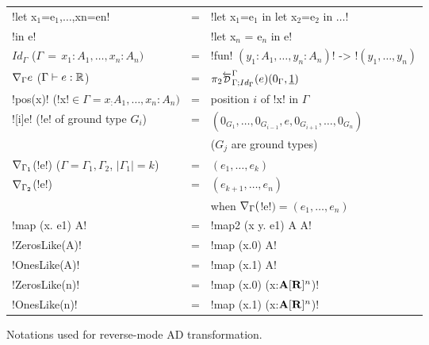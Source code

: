 \begin{figure}
\begin{tabular}{|l c l|}
    \hline
    !let x$_{1}$=e$_{1}$,$\ldots$,xn=en!  & \multirow{2}{*}{=} & !let x$_{1}$=e$_{1}$ in let x$_{2}$=e$_{2}$ in $\ldots$! \\
    !in e! && !let x$_n$ = e$_n$ in e!\\ \hline
    $Id_\Gamma$ \quad\quad\quad ($\Gamma \, = \, x_1:A_1,\ldots,x_n:A_n)$ & = & !fun! $(y_1:A_1,\ldots,y_n:A_n)$! -> !$(y_1,\ldots,y_n)$ \\ \hline
    $\nabla_\Gamma e$ \quad\quad\hspace{0.6em}($\Gamma\vdash e:\mathbb{R}$) & = & $\pi_2\directD{\Gamma}{\Gamma}{Id_\Gamma}(e)(0_\Gamma,\underline{1})$ \\ \hline
    !pos(x)! \quad(!x!$\in\Gamma=x_:A_1,\ldots,x_n:A_n)$ & = & position $i$ of !x! in $\Gamma$ \\ \hline
    ![i]e! \quad\quad(!e! of ground type $G_i$) & \multirow{2}{*}{=} &  $(0_{G_1},\ldots,0_{G_{i-1}},e,0_{G_{i+1}},\ldots,0_{G_n})$ \\
    && ($G_j$ are ground types) \\ \hline
    $\nabla_{\Gamma_1}$(!e!) \quad\quad($\Gamma=\Gamma_1,\Gamma_2$, $|\Gamma_1|=k$)& = & $(e_1,\ldots,e_k)$ \\
    $\nabla_{\Gamma_2}$(!e!) & = & $(e_{k+1},\ldots,e_n)$ \\
    && when $\nabla_{\Gamma}($!e!$) = (e_1,\ldots,e_n)$ \\ \hline
    !map (x. e1) A! & = & !map2 (x y. e1) A A! \\ \hline
    !ZerosLike(A)! & = & !map (x.0) A! \\ \hline
    !OnesLike(A)! & = & !map (x.1) A! \\ \hline
    !ZerosLike(n)! & = & !map (x.0) (x:$\mathbf{A}[\mathbf{R}]^{n}$)! \\ \hline
    !OnesLike(n)! & = & !map (x.1) (x:$\mathbf{A}[\mathbf{R}]^{n}$)! \\ \hline
\end{tabular}
\vspace{-0.4cm}
\caption{Notations used for reverse-mode AD transformation.}
\vspace{-0.4cm}
\label{tbl:notation:one}
\end{figure}
